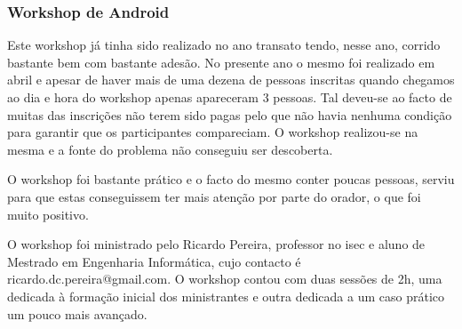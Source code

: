 
\subsubsection{Workshop de Android}

Este workshop já tinha sido realizado no ano transato tendo, nesse ano, corrido bastante bem com bastante adesão. No presente ano o mesmo foi realizado em abril e apesar de haver mais de uma dezena de pessoas inscritas quando chegamos ao dia e hora do workshop apenas apareceram 3 pessoas. Tal deveu-se ao facto de muitas das inscrições não terem sido pagas pelo que não havia nenhuma condição para garantir que os participantes compareciam. O workshop realizou-se na mesma e a fonte do problema não conseguiu ser descoberta.

O workshop foi bastante prático e o facto do mesmo conter poucas pessoas, serviu para que estas conseguissem ter mais atenção por parte do orador, o que foi muito positivo.

O workshop foi ministrado pelo Ricardo Pereira, professor no \acrfull{isec} e aluno de Mestrado em Engenharia Informática, cujo contacto é ricardo.dc.pereira@gmail.com. O workshop contou com duas sessões de 2h, uma dedicada à formação inicial dos ministrantes e outra dedicada a um caso prático um pouco mais avançado.
